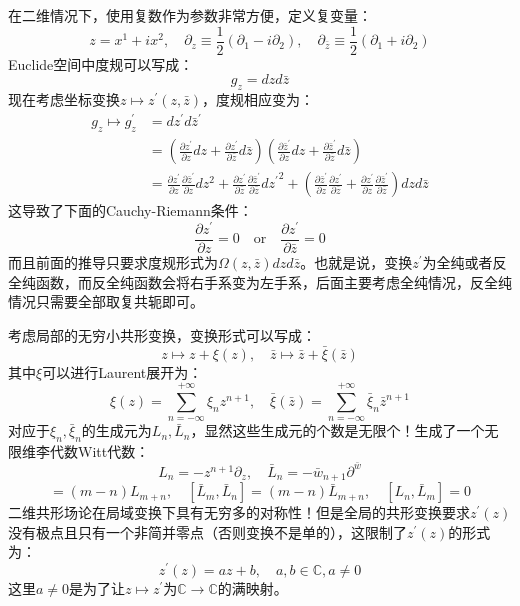 	在二维情况下，使用复数作为参数非常方便，定义复变量：
	\[z=x^1+ix^2,\quad \partial_z\equiv\frac{1}{2}(\partial_1-i\partial_2),\quad \partial_{\bar z}\equiv\frac{1}{2}(\partial_1+i\partial_2)\]
	Euclide空间中度规可以写成：
	\begin{equation}
		g_z = dzd\bar z
	\end{equation}
	现在考虑坐标变换$z\mapsto z^\prime(z,\bar z)$，度规相应变为：
	\begin{equation}
		\begin{aligned}
			g_z\mapsto g^\prime_z&=dz^\prime d{\bar z}^\prime\\
			&=\left(\frac{\partial z^\prime}{\partial z}dz+\frac{\partial z^\prime}{\partial\bar z}d\bar z\right)
			\left(\frac{\partial \bar z^\prime}{\partial z}dz+\frac{\partial \bar z^\prime}{\partial\bar z}d\bar z\right)\\
			&=\frac{\partial z^\prime}{\partial z}\frac{\partial \bar z^\prime}{\partial z}dz^2+\frac{\partial z^\prime}{\partial \bar z}\frac{\partial \bar z^\prime}{\partial \bar z}{dz^\prime}^2+\left(\frac{\partial \bar z^\prime}{\partial  z}\frac{\partial  z^\prime}{\partial \bar z}+\frac{\partial z^\prime}{\partial z}\frac{\partial \bar z^\prime}{\partial \bar z}\right)dzd\bar z
		\end{aligned}
	\end{equation}
	这导致了下面的Cauchy-Riemann条件：
	\begin{equation}
		\frac{\partial z^\prime}{\partial z}=0\quad \text{or}\quad \frac{\partial z^\prime}{\partial \bar z}=0
	\end{equation}
	而且前面的推导只要求度规形式为$\Omega(z,\bar z)dzd\bar z$。也就是说，变换$z^\prime$为全纯或者反全纯函数，而反全纯函数会将右手系变为左手系，后面主要考虑全纯情况，反全纯情况只需要全部取复共轭即可。
	
	考虑局部的无穷小共形变换，变换形式可以写成：
	\[z\mapsto z+\xi(z),\quad \bar z\mapsto \bar z+\bar\xi(\bar z)\]
	其中$\xi$可以进行Laurent展开为：
	\[\xi(z)=\sum_{n=-\infty}^{+\infty}\xi_n z^{n+1} ,\quad \bar\xi(\bar z)=\sum_{n=-\infty}^{+\infty}\bar\xi_n \bar z^{n+1}\]
	对应于$\xi_n,\bar\xi_n$的生成元为$L_n,\bar L_n$，显然这些生成元的个数是无限个！生成了一个无限维李代数Witt代数：
	\begin{equation}
		L_n=-z^{n+1}\partial_z,\quad \bar L_n=-\bar w_{n+1}\partial^{\bar w}
	\end{equation}
	\begin{equation}
		[L_m,L_n]=(m-n)L_{m+n},\quad [\bar L_m,\bar L_n]=(m-n)\bar L_{m+n},\quad [L_n,\bar L_m]=0
	\end{equation}
	二维共形场论在局域变换下具有无穷多的对称性！但是全局的共形变换要求$z^\prime(z)$没有极点且只有一个非简并零点（否则变换不是单的），这限制了$z^\prime(z)$的形式为：
	\begin{equation}
		z^\prime(z)=a z+b,\quad a,b\in\mathbb{C}, a\neq 0
	\end{equation}
	这里$a\neq 0$是为了让$z\mapsto z^\prime$为$\mathbb{C}\to \mathbb{C}$的满映射。
	
